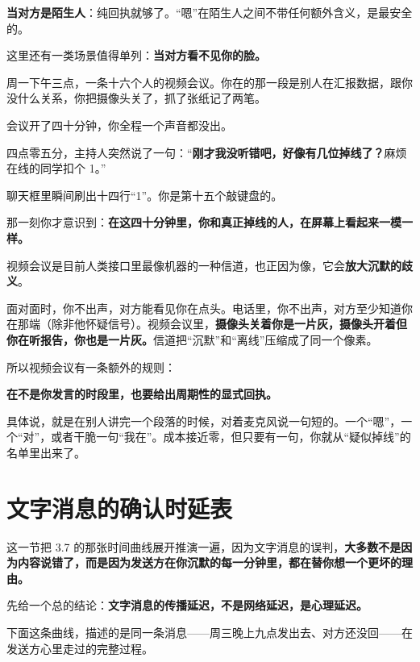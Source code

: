 \textbf{当对方是陌生人}：纯回执就够了。“嗯”在陌生人之间不带任何额外含义，是最安全的。

这里还有一类场景值得单列：\textbf{当对方看不见你的脸。}

\par
\begin{mdquote}
周一下午三点，一条十六个人的视频会议。你在的那一段是别人在汇报数据，跟你没什么关系，你把摄像头关了，抓了张纸记了两笔。

会议开了四十分钟，你全程一个声音都没出。

四点零五分，主持人突然说了一句：“\textbf{刚才我没听错吧，好像有几位掉线了？}麻烦在线的同学扣个 1。”

聊天框里瞬间刷出十四行“1”。你是第十五个敲键盘的。

那一刻你才意识到：\textbf{在这四十分钟里，你和真正掉线的人，在屏幕上看起来一模一样。}
\end{mdquote}

视频会议是目前人类接口里最像机器的一种信道，也正因为像，它会\textbf{放大沉默的歧义}。

面对面时，你不出声，对方能看见你在点头。电话里，你不出声，对方至少知道你在那端（除非他怀疑信号）。视频会议里，\textbf{摄像头关着你是一片灰，摄像头开着但你在听报告，你也是一片灰。}信道把“沉默”和“离线”压缩成了同一个像素。

所以视频会议有一条额外的规则：

\textbf{在不是你发言的时段里，也要给出周期性的显式回执。}

具体说，就是在别人讲完一个段落的时候，对着麦克风说一句短的。一个“嗯”，一个“对”，或者干脆一句“我在”。成本接近零，但只要有一句，你就从“疑似掉线”的名单里出来了。

\section{文字消息的确认时延表}

这一节把 3.7 的那张时间曲线展开推演一遍，因为文字消息的误判，\textbf{大多数不是因为内容说错了，而是因为发送方在你沉默的每一分钟里，都在替你想一个更坏的理由。}

先给一个总的结论：\textbf{文字消息的传播延迟，不是网络延迟，是心理延迟。}

下面这条曲线，描述的是同一条消息——周三晚上九点发出去、对方还没回——在发送方心里走过的完整过程。

